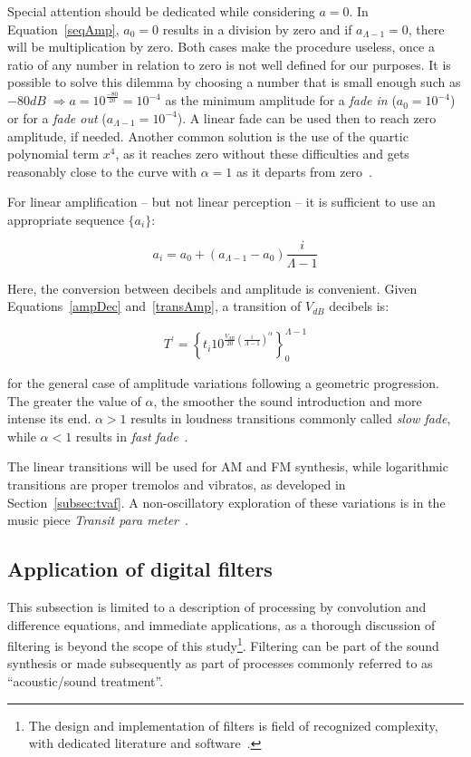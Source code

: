 Special attention should be dedicated while considering $a=0$.
In Equation~\ref{seqAmp}, $a_0=0$ results in a division by zero and if $a_{\Lambda-1}=0$, there will be multiplication by zero. Both cases make the procedure useless, once a ratio of any number in relation to zero is not well defined for our purposes. It is possible to solve this dilemma by choosing a number that is small enough such as $-80dB\;\Rightarrow a=10^{\frac{-80}{20}}=10^{-4}$ as the minimum amplitude for a \emph{fade in} ($a_0=10^{-4}$) or for a \emph{fade out} ($a_{\Lambda-1}=10^{-4}$). A linear fade can be used then to reach zero amplitude, if needed. Another common solution is the use of the quartic polynomial term $x^4$, as it reaches zero without these difficulties and gets reasonably close to the curve with $\alpha=1$ as it departs from zero~\cite{Cook}.

For linear amplification -- but not linear perception -- it is sufficient to use an appropriate sequence $\{a_i\}$:

\begin{equation}\label{seqAmpLin}
a_i=a_0 + (a_{\Lambda-1}-a_0)\frac{i}{\Lambda-1}
\end{equation}

Here, the conversion between decibels and amplitude is convenient. Given Equations~\ref{ampDec} and~\ref{transAmp}, a transition of $V_{dB}$ decibels is:

\begin{equation}\label{seqAmpDB}
T^{'}=\left\{ t_i 10^{\frac{V_{dB}}{20}\left( \frac{i}{\Lambda-1} \right)^\alpha} \right\}_0^{\Lambda-1}
\end{equation}

\noindent for the general case of amplitude variations following a geometric progression. The greater the value of $\alpha$, the smoother the sound introduction and more intense its end. $\alpha>1$ results in loudness transitions commonly called \emph{slow fade}, while $\alpha<1$ results in \emph{fast fade}~\cite{guillaume}.

The linear transitions will be used for AM and FM synthesis, while logarithmic transitions are proper tremolos and vibratos, as developed in Section~\ref{subsec:tvaf}. A non-oscillatory exploration of these variations is in the music piece \emph{Transit para meter}~\cite{MASSA}.

\subsection{Application of digital filters}\label{subsec:filtros}
This subsection is limited to a description of processing by convolution and difference equations, and immediate applications, as a thorough discussion of filtering is beyond the scope of this study\footnote{The
design and implementation of filters is field of recognized complexity,
with dedicated literature and software~\cite{Openheim,smith}.}. Filtering can be part of the sound synthesis or made subsequently as part of processes commonly referred to as ``acoustic/sound treatment''.

